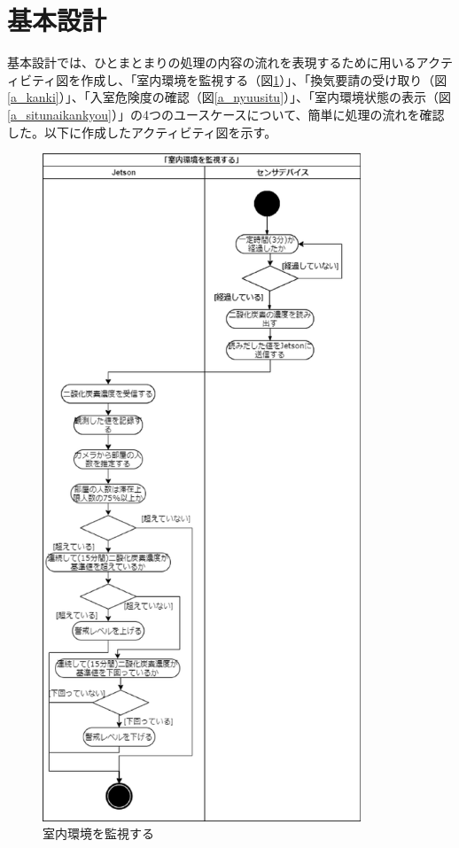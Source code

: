 \section{基本設計}
基本設計では、ひとまとまりの処理の内容の流れを表現するために用いるアクティビティ図を作成し、「室内環境を監視する（図\ref{a_kansi}）」、「換気要請の受け取り（図\ref{a_kanki}）」、「入室危険度の確認（図\ref{a_nyuusitu}）」、「室内環境状態の表示（図\ref{a_situnaikankyou}）」の4つのユースケースについて、簡単に処理の流れを確認した。以下に作成したアクティビティ図を示す。


\begin{figure}[H]
	\centering
	\includegraphics[width=9.5cm]{a_kansi.eps}
	\caption{室内環境を監視する}
	\label{a_kansi}
\end{figure}


